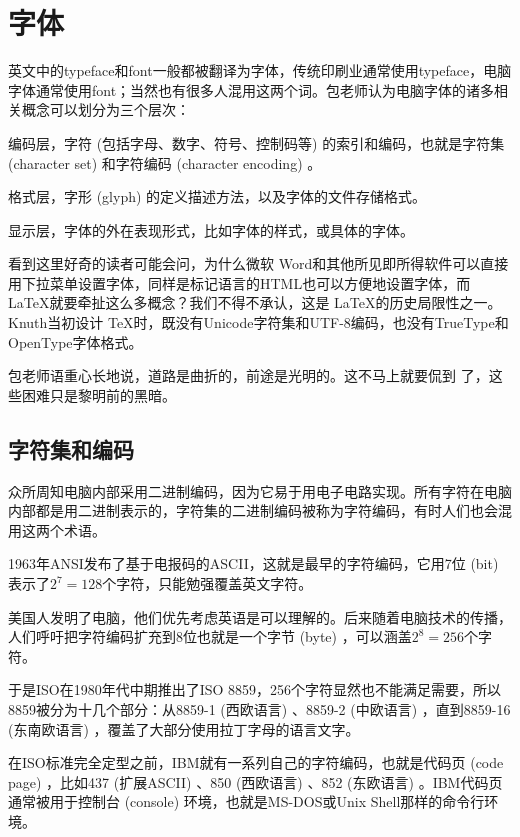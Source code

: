 \chapter{字体}

英文中的typeface和font一般都被翻译为字体，传统印刷业通常使用typeface，电脑字体通常使用font；当然也有很多人混用这两个词。包老师认为电脑字体的诸多相关概念可以划分为三个层次：

\begin{compactenum}
    \item 编码层，字符 (包括字母、数字、符号、控制码等) 的索引和编码，也就是字符集 (character set) 和字符编码 (character encoding) 。
    \item 格式层，字形 (glyph) 的定义描述方法，以及字体的文件存储格式。
    \item 显示层，字体的外在表现形式，比如字体的样式，或具体的字体。
\end{compactenum}

看到这里好奇的读者可能会问，为什么微软\indexMSFT{} Word和其他所见即所得软件可以直接用下拉菜单设置字体，同样是标记语言的HTML也可以方便地设置字体，而 \LaTeX 就要牵扯这么多概念？我们不得不承认，这是 \LaTeX 的历史局限性之一。Knuth\indexKnuth 当初设计 \TeX 时，既没有Unicode字符集和UTF-8编码，也没有TrueType和OpenType字体格式。

包老师语重心长地说，道路是曲折的，前途是光明的。这不马上就要侃到 \XeTeX 了，这些困难只是黎明前的黑暗。

\section{字符集和编码}
\label{sec:encoding}

众所周知电脑内部采用二进制编码，因为它易于用电子电路实现。所有字符在电脑内部都是用二进制表示的，字符集的二进制编码被称为字符编码，有时人们也会混用这两个术语。

1963年ANSI\indexANSI 发布了基于电报码的ASCII，这就是最早的字符编码，它用7位 (bit) 表示了$2^7=128$个字符，只能勉强覆盖英文字符。

美国人发明了电脑，他们优先考虑英语是可以理解的。后来随着电脑技术的传播，人们呼吁把字符编码扩充到8位也就是一个字节 (byte) ，可以涵盖$2^8=256$个字符。

于是ISO\indexISO 在1980年代中期推出了ISO 8859，256个字符显然也不能满足需要，所以8859被分为十几个部分：从8859-1 (西欧语言) 、8859-2 (中欧语言) ，直到8859-16 (东南欧语言) ，覆盖了大部分使用拉丁字母的语言文字。

在ISO标准完全定型之前，IBM就有一系列自己的字符编码，也就是代码页 (code page) ，比如437 (扩展ASCII) 、850 (西欧语言) 、852 (东欧语言) 。IBM\indexIBM 代码页通常被用于控制台 (console) 环境，也就是MS-DOS或Unix Shell那样的命令行环境。

